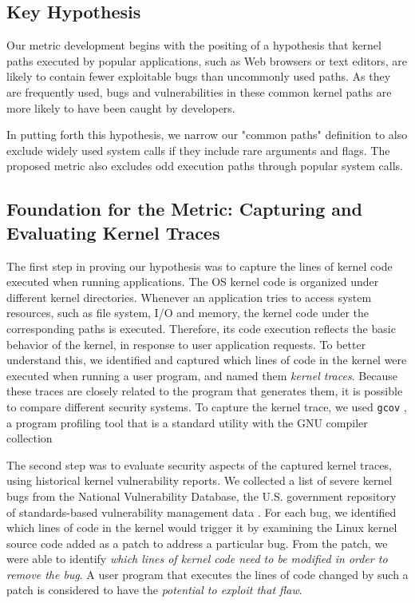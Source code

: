 


\subsection{Key Hypothesis}

Our metric development begins with the positing of a hypothesis
that kernel paths executed by popular applications, such as Web browsers or
text editors, are likely to contain fewer exploitable bugs than uncommonly used paths.
As they are frequently used, bugs and vulnerabilities in these common kernel
paths are more likely to have been caught by developers.

In putting forth this hypothesis, we narrow our "common paths" definition
to also exclude widely used system calls if they include rare arguments
and flags. The proposed metric also excludes odd execution paths through popular
system calls.

\subsection{Foundation for the Metric: Capturing and Evaluating Kernel Traces}

The first step in proving our hypothesis was to capture the lines of kernel
code executed when running applications. The OS kernel code
is organized under different kernel directories.
Whenever an application tries to access system resources, such as file
system, I/O and memory, the kernel code under the corresponding paths is executed. Therefore,
its code execution reflects the basic behavior of the kernel, in response
to user application requests. To better understand this, we identified and
captured which lines of code in the kernel
were executed when running a user program, and named them  \textit{kernel traces}.
Because these traces are closely related to the program that generates them, it is
possible to compare different security systems.
To capture the kernel trace, we used \texttt{gcov} \cite{gcov}, a program profiling
tool that is a standard utility with the GNU compiler collection

The second step was to evaluate security aspects of the captured kernel traces,%
using historical kernel vulnerability reports. We collected a list of
severe kernel bugs from the National Vulnerability Database, the U.S. government repository of
standards-based vulnerability management data \cite{NVD}. For each bug, we
identified which lines of code
in the kernel would trigger it by examining the Linux kernel source code
added as a patch to address a particular bug. From the patch,
we were able to identify \textit{which lines of kernel code need to be modified in order to
remove the bug}.
A user program that executes the lines of code changed by such a patch
is considered to have the \textit{potential to exploit that flaw}.


